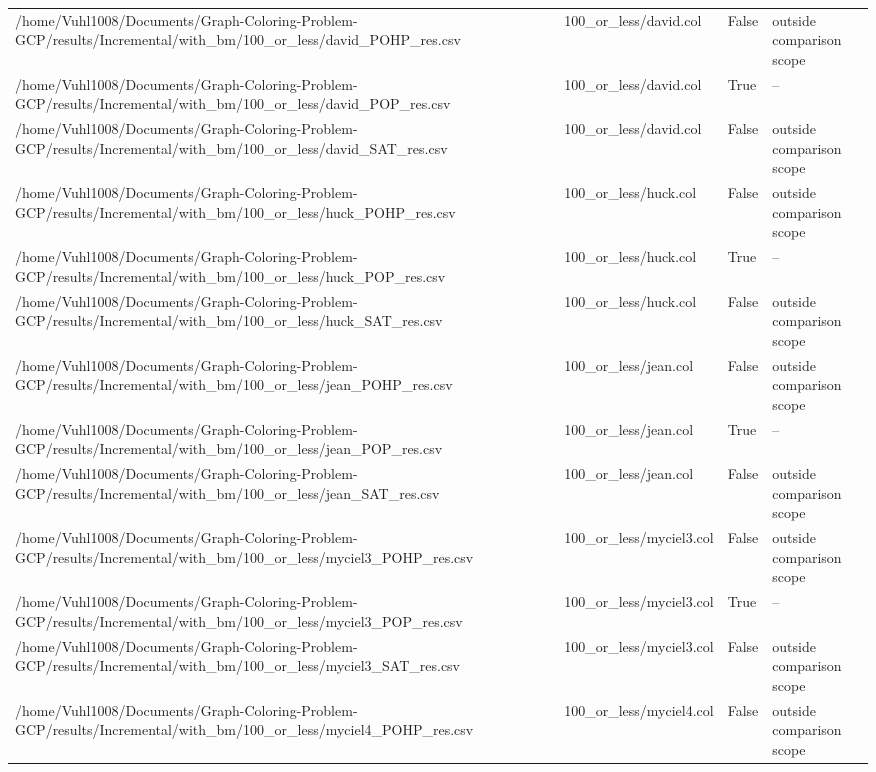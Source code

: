 \begin{table}[htbp]
\begin{tabular}{llll}
/home/Vuhl1008/Documents/Graph-Coloring-Problem-GCP/results/Incremental/with\_bm/100\_or\_less/david\_POHP\_res.csv & 100\_or\_less/david.col & False & outside comparison scope \\
/home/Vuhl1008/Documents/Graph-Coloring-Problem-GCP/results/Incremental/with\_bm/100\_or\_less/david\_POP\_res.csv & 100\_or\_less/david.col & True & -- \\
/home/Vuhl1008/Documents/Graph-Coloring-Problem-GCP/results/Incremental/with\_bm/100\_or\_less/david\_SAT\_res.csv & 100\_or\_less/david.col & False & outside comparison scope \\
/home/Vuhl1008/Documents/Graph-Coloring-Problem-GCP/results/Incremental/with\_bm/100\_or\_less/huck\_POHP\_res.csv & 100\_or\_less/huck.col & False & outside comparison scope \\
/home/Vuhl1008/Documents/Graph-Coloring-Problem-GCP/results/Incremental/with\_bm/100\_or\_less/huck\_POP\_res.csv & 100\_or\_less/huck.col & True & -- \\
/home/Vuhl1008/Documents/Graph-Coloring-Problem-GCP/results/Incremental/with\_bm/100\_or\_less/huck\_SAT\_res.csv & 100\_or\_less/huck.col & False & outside comparison scope \\
/home/Vuhl1008/Documents/Graph-Coloring-Problem-GCP/results/Incremental/with\_bm/100\_or\_less/jean\_POHP\_res.csv & 100\_or\_less/jean.col & False & outside comparison scope \\
/home/Vuhl1008/Documents/Graph-Coloring-Problem-GCP/results/Incremental/with\_bm/100\_or\_less/jean\_POP\_res.csv & 100\_or\_less/jean.col & True & -- \\
/home/Vuhl1008/Documents/Graph-Coloring-Problem-GCP/results/Incremental/with\_bm/100\_or\_less/jean\_SAT\_res.csv & 100\_or\_less/jean.col & False & outside comparison scope \\
/home/Vuhl1008/Documents/Graph-Coloring-Problem-GCP/results/Incremental/with\_bm/100\_or\_less/myciel3\_POHP\_res.csv & 100\_or\_less/myciel3.col & False & outside comparison scope \\
/home/Vuhl1008/Documents/Graph-Coloring-Problem-GCP/results/Incremental/with\_bm/100\_or\_less/myciel3\_POP\_res.csv & 100\_or\_less/myciel3.col & True & -- \\
/home/Vuhl1008/Documents/Graph-Coloring-Problem-GCP/results/Incremental/with\_bm/100\_or\_less/myciel3\_SAT\_res.csv & 100\_or\_less/myciel3.col & False & outside comparison scope \\
/home/Vuhl1008/Documents/Graph-Coloring-Problem-GCP/results/Incremental/with\_bm/100\_or\_less/myciel4\_POHP\_res.csv & 100\_or\_less/myciel4.col & False & outside comparison scope \\

\end{tabular}
\end{table}
